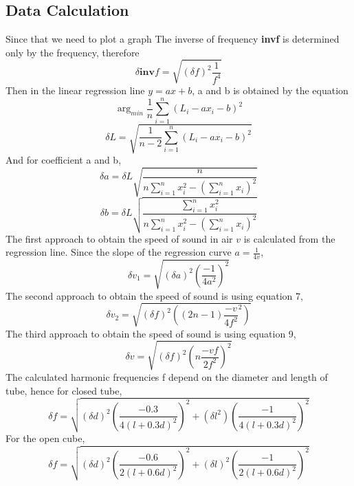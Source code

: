 \documentclass[12pt]{article}
\begin{document}
 	\subsection{Data Calculation}
 	Since that we need to plot a graph The inverse of frequency \textbf{invf} is determined only by the frequency, therefore
 	\begin{equation}
 		\delta \textbf{inv}f = \sqrt{(\delta f)^2\frac{1}{f^4}}
 	\end{equation}
 	Then in the linear regression line $y = ax + b$, a and b is obtained by the equation
 	\begin{equation}
 		\arg_{min}\frac{1}{n}\sum_{i = 1}^{n}(L_i-ax_i-b)^2
 	\end{equation}
 	\begin{equation}
 		\delta L = \sqrt{\frac{1}{n-2}\sum_{i=1}^{n}(L_i-ax_i-b)^2}
 	\end{equation}
 	And for coefficient a and b,
 	\begin{equation}
 		\delta a = \delta L\sqrt{\frac{n}{n\sum_{i=1}^{n}x_i^2 - (\sum_{i=1}^{n}x_i)^2}}
 	\end{equation}
 	\begin{equation}
 		\delta b = \delta L\sqrt{\frac{\sum_{i=1}^{n}x_i^2}{n\sum_{i=1}^{n}x_i^2 - (\sum_{i=1}^{n}x_i)^2}}
 	\end{equation}
 	The first approach to obtain the speed of sound in air $ v $ is calculated from the regression line. Since the slope of the regression curve $a = \frac{1}{4v}$,
 	\begin{equation}
 		\delta v_1 = \sqrt{(\delta a)^2 (\frac{-1}{4a^2})^2}
 	\end{equation}
 	The second approach to obtain the speed of sound is using equation 7,
 	\begin{equation}
 		\delta v_2 = \sqrt{(\delta f)^2((2n-1)\frac{-v}{4f^2}^2)}
 	\end{equation}
 	The third approach to obtain the speed of sound is using equation 9,
 	\begin{equation}
 		\delta v = \sqrt{(\delta f)^2(n\frac{-vf}{2f^2})^2}
 	\end{equation}
 	The calculated harmonic frequencies f depend on the diameter and length of tube, hence for closed tube,
 	\begin{equation}
 		\delta f = \sqrt{(\delta d)^2(\frac{-0.3}{4(l+0.3d)^2})^2+(\delta l^2)(\frac{-1}{4(l+0.3d)^2})^2}
 	\end{equation}
 	For the open cube,
 	\begin{equation}
 		\delta f = \sqrt{(\delta d)^2(\frac{-0.6}{2(l+0.6d)^2})^2 + (\delta l)^2(\frac{-1}{2(l+0.6d)^2})^2}
 	\end{equation}
\end{document}

